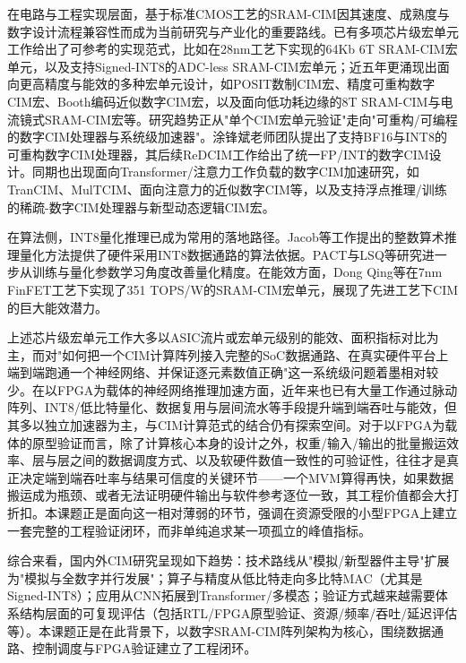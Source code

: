 \documentclass[bachelor,compact,nofont]{xjtuthesis}
\numberwithin{equation}{chapter}
\begin{document}
在电路与工程实现层面，基于标准CMOS工艺的SRAM-CIM因其速度、成熟度与数字设计流程兼容性而成为当前研究与产业化的重要路线\cite{5}\cite{12}\cite{14}。已有多项芯片级宏单元工作给出了可参考的实现范式，比如在28nm工艺下实现的64Kb 6T SRAM-CIM宏单元\cite{32}，以及支持Signed-INT8的ADC-less SRAM-CIM宏单元\cite{8}；近五年更涌现出面向更高精度与能效的多种宏单元设计，如POSIT数制CIM宏\cite{r2}、精度可重构数字CIM宏\cite{r3}、Booth编码近似数字CIM宏\cite{r5}，以及面向低功耗边缘的8T SRAM-CIM\cite{r16}与电流镜式SRAM-CIM宏\cite{r17}等。研究趋势正从"单个CIM宏单元验证"走向"可重构/可编程的数字CIM处理器与系统级加速器"。涂锋斌老师团队提出了支持BF16与INT8的可重构数字CIM处理器\cite{24}，其后续ReDCIM工作给出了统一FP/INT的数字CIM设计\cite{25}。同期也出现面向Transformer/注意力工作负载的数字CIM加速研究，如TranCIM\cite{26}、MulTCIM\cite{27}、面向注意力的近似数字CIM\cite{r4}等，以及支持浮点推理/训练的稀疏-数字CIM处理器\cite{r6}与新型动态逻辑CIM宏\cite{r7}。

在算法侧，INT8量化推理已成为常用的落地路径。Jacob等工作提出的整数算术推理量化方法提供了硬件采用INT8数据通路的算法依据\cite{6}。PACT\cite{28}与LSQ\cite{29}等研究进一步从训练与量化参数学习角度改善量化精度。在能效方面，Dong Qing等在7nm FinFET工艺下实现了351 TOPS/W的SRAM-CIM宏单元\cite{33}，展现了先进工艺下CIM的巨大能效潜力。

上述芯片级宏单元工作大多以ASIC流片或宏单元级别的能效、面积指标对比为主，而对"如何把一个CIM计算阵列接入完整的SoC数据通路、在真实硬件平台上端到端跑通一个神经网络、并保证逐元素数值正确"这一系统级问题着墨相对较少。在以FPGA为载体的神经网络推理加速方面，近年来也已有大量工作通过脉动阵列、INT8/低比特量化、数据复用与层间流水等手段提升端到端吞吐与能效\cite{r14}\cite{r15}，但其多以独立加速器为主，与CIM计算范式的结合仍有探索空间。对于以FPGA为载体的原型验证而言，除了计算核心本身的设计之外，权重/输入/输出的批量搬运效率、层与层之间的数据调度方式、以及软硬件数值一致性的可验证性，往往才是真正决定端到端吞吐率与结果可信度的关键环节——一个MVM算得再快，如果数据搬运成为瓶颈、或者无法证明硬件输出与软件参考逐位一致，其工程价值都会大打折扣。本课题正是面向这一相对薄弱的环节，强调在资源受限的小型FPGA上建立一套完整的工程验证闭环，而非单纯追求某一项孤立的峰值指标。

综合来看，国内外CIM研究呈现如下趋势：技术路线从"模拟/新型器件主导"扩展为"模拟与全数字并行发展"；算子与精度从低比特走向多比特MAC（尤其是Signed-INT8）；应用从CNN拓展到Transformer/多模态；验证方式越来越需要体系结构层面的可复现评估（包括RTL/FPGA原型验证、资源/频率/吞吐/延迟评估等）\cite{12}\cite{16}。本课题正是在此背景下，以数字SRAM-CIM阵列架构为核心，围绕数据通路、控制调度与FPGA验证建立了工程闭环。
\end{document}
